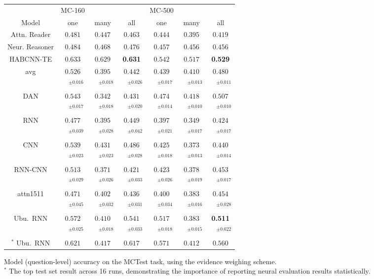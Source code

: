 \documentclass[11pt]{article}
\begin{document}
\begin{figure*}[t]
\centering
\setlength{\tabcolsep}{3pt}
\begin{tabular}{|c|ccc|ccc|}
\hline
                   & MC-160     &             &            & MC-500     &      & \\
Model              & one & many & all & one & many & all \\
\hline
Attn. Reader & $0.481$ & $0.447$ & $0.463$ & $0.444$ & $0.395$ & $0.419$\\
Neur. Reasoner & $0.484$ & $0.468$ & $0.476$ & $0.457$ & $0.456$ & $0.456$\\
HABCNN-TE & $0.633$ & $0.629$ & \textbf{0.631} & $0.542$ & $0.517$ & \textbf{0.529}\\
\hline
avg & $0.526$ & $0.395$ & $0.442$ & $0.439$ & $0.410$ & $0.480$\\
 & $\quad^{\pm0.016}$ & $\quad^{\pm0.018}$ & $\quad^{\pm0.026}$ & $\quad^{\pm0.017}$ & $\quad^{\pm0.013}$ & $\quad^{\pm0.011}$\\
DAN & $0.543$ & $0.342$ & $0.431$ & $0.474$ & $0.418$ & $0.507$\\
 & $\quad^{\pm0.017}$ & $\quad^{\pm0.018}$ & $\quad^{\pm0.020}$ & $\quad^{\pm0.014}$ & $\quad^{\pm0.010}$ & $\quad^{\pm0.010}$\\
\hline
RNN & $0.477$ & $0.395$ & $0.449$ & $0.397$ & $0.349$ & $0.424$\\
 & $\quad^{\pm0.039}$ & $\quad^{\pm0.028}$ & $\quad^{\pm0.042}$ & $\quad^{\pm0.021}$ & $\quad^{\pm0.017}$ & $\quad^{\pm0.017}$\\
CNN & $0.539$ & $0.431$ & $0.486$ & $0.425$ & $0.373$ & $0.440$\\
 & $\quad^{\pm0.023}$ & $\quad^{\pm0.023}$ & $\quad^{\pm0.028}$ & $\quad^{\pm0.018}$ & $\quad^{\pm0.013}$ & $\quad^{\pm0.014}$\\
RNN-CNN & $0.513$ & $0.371$ & $0.421$ & $0.423$ & $0.378$ & $0.453$\\
 & $\quad^{\pm0.029}$ & $\quad^{\pm0.026}$ & $\quad^{\pm0.033}$ & $\quad^{\pm0.026}$ & $\quad^{\pm0.019}$ & $\quad^{\pm0.017}$\\
attn1511 & $0.471$ & $0.402$ & $0.436$ & $0.400$ & $0.383$ & $0.454$\\
 & $\quad^{\pm0.045}$ & $\quad^{\pm0.032}$ & $\quad^{\pm0.031}$ & $\quad^{\pm0.034}$ & $\quad^{\pm0.016}$ & $\quad^{\pm0.028}$\\
Ubu.\ RNN & $0.572$ & $0.410$ & $0.541$ & $0.517$ & $0.383$ & \textbf{0.511}\\
 & $\quad^{\pm0.025}$ & $\quad^{\pm0.018}$ & $\quad^{\pm0.033}$ & $\quad^{\pm0.018}$ & $\quad^{\pm0.015}$ & $\quad^{\pm0.022}$\\
\hline
$^*$ Ubu.\ RNN & $0.621$ & $0.417$ & $0.617$ & $0.571$ & $0.412$ & $0.560$\\
\hline
\end{tabular}
\setlength{\tabcolsep}{6pt}
\vspace*{-0.2cm}
\caption{\footnotesize%
	Model (question-level) accuracy on the MCTest task, using the evidence weighing scheme. \\
	$^*$ The top test set result across 16 runs, demonstrating the importance
	of reporting neural evaluation results statistically.
}
\label{tab:mctest}
\end{figure*}
\end{document}
